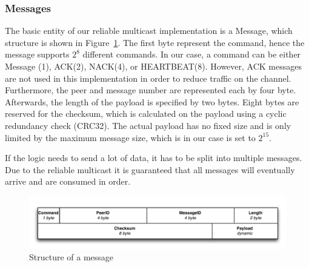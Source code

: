 \subsubsection{Messages}
The basic entity of our reliable multicast implementation is a Message, which structure is shown in Figure~\ref{fig:messages}. The first byte represent the command, hence the message supports $2^8$ different commands. In our case, a command can be either Message (1), ACK(2), NACK(4), or HEARTBEAT(8). However, ACK messages are not used in this implementation in order to reduce traffic on the channel. Furthermore, the peer and message number are represented each by four byte. Afterwards, the length of the payload is specified by two bytes. Eight bytes are reserved for the checksum, which is calculated on the payload using a cyclic redundancy check (CRC32). The actual payload has no fixed size and is only limited by the maximum message size, which is in our case is set to $2^{15}$.

If the logic needs to send a lot of data, it has to be split into multiple messages. Due to the reliable multicast it is guaranteed that all messages will eventually arrive and are consumed in order.

\begin{figure}[htbp]
    \centering
        \includegraphics[width=.9\textwidth]{figures/message.pdf}
    \caption{Structure of a message}
    \label{fig:messages}
\end{figure}


